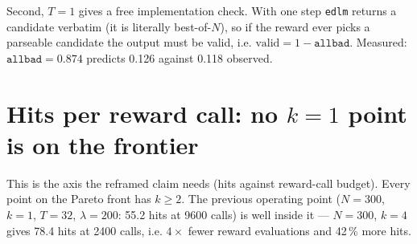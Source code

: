 \documentclass[11pt]{article}
\begin{document}
Second, $T=1$ gives a free implementation check. With one step \texttt{edlm}
returns a candidate verbatim (it is literally best-of-$N$), so if the reward ever
picks a parseable candidate the output must be valid, i.e.
$\mathrm{valid} = 1 - \texttt{allbad}$. Measured: $\texttt{allbad}=0.874$
predicts 0.126 against 0.118 observed.

\begin{table}[htbp]
\centering
\small
{}
\caption{$N=1000$, $\lambda=200$, hits@0.6. $k=16$ and $32$ are a follow-up at this $N$ only. Absolute hits peak at $k=8$; hits per reward call keep rising to $k=32$.}
\label{tab:fs-extension}
\end{table}


\section{Hits per reward call: no $k=1$ point is on the frontier}

This is the axis the reframed claim needs (hits against reward-call
budget). Every point on the Pareto front has $k\ge 2$. The previous operating
point ($N=300$, $k=1$, $T=32$, $\lambda=200$: 55.2 hits at 9600 calls) is well
inside it --- $N=300$, $k=4$ gives 78.4 hits at 2400 calls, i.e.
$4\times$ fewer reward evaluations and 42\,\% more hits.
\end{document}
